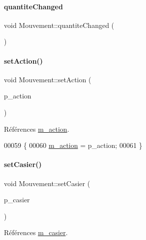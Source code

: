 \paragraph{\texorpdfstring{quantite\+Changed}{quantiteChanged}}
{\footnotesize\ttfamily void Mouvement\+::quantite\+Changed (\begin{DoxyParamCaption}{ }\end{DoxyParamCaption})\hspace{0.3cm}{\ttfamily [signal]}}

\mbox{\label{class_mouvement_a2c64d36ea78ea6b428ddd0a0610411c1}} 
\paragraph{\texorpdfstring{set\+Action()}{setAction()}}
{\footnotesize\ttfamily void Mouvement\+::set\+Action (\begin{DoxyParamCaption}\item[{Q\+String}]{p\+\_\+action }\end{DoxyParamCaption})}



Références \hyperlink{class_mouvement_af0444a7f837bdf252f2a3ccd4eb8a701}{m\+\_\+action}.


\begin{DoxyCode}
00059 \{
00060     \hyperlink{class_mouvement_af0444a7f837bdf252f2a3ccd4eb8a701}{m\_action} = p\_action;
00061 \}
\end{DoxyCode}
\mbox{\label{class_mouvement_ad47317b7671e3b9b7e6e060f667924a7}} 
\paragraph{\texorpdfstring{set\+Casier()}{setCasier()}}
{\footnotesize\ttfamily void Mouvement\+::set\+Casier (\begin{DoxyParamCaption}\item[{Q\+String}]{p\+\_\+casier }\end{DoxyParamCaption})}



Références \hyperlink{class_mouvement_a186f483cf82ff2866da1e10031838567}{m\+\_\+casier}.


